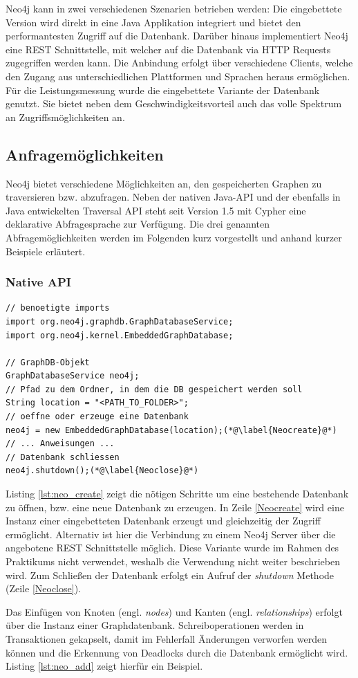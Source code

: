 \documentclass[11pt, a4paper, oneside]{article} %
\begin{document}
Neo4j kann in zwei verschiedenen Szenarien betrieben werden: Die eingebettete Version wird direkt in eine Java Applikation integriert und bietet den performantesten Zugriff auf die Datenbank. Darüber hinaus implementiert Neo4j eine REST Schnittstelle, mit welcher auf die Datenbank via HTTP Requests zugegriffen werden kann. Die Anbindung erfolgt über verschiedene Clients, welche den Zugang aus unterschiedlichen Plattformen und Sprachen heraus ermöglichen.\\
Für die Leistungsmessung wurde die eingebettete Variante der Datenbank genutzt. Sie bietet neben dem Geschwindigkeitsvorteil auch das volle Spektrum an Zugriffsmöglichkeiten an.

\subsection{Anfragemöglichkeiten}

Neo4j bietet verschiedene Möglichkeiten an, den gespeicherten Graphen zu traversieren bzw. abzufragen. Neben der nativen Java-API und der ebenfalls in Java entwickelten Traversal API steht seit Version 1.5 mit Cypher eine deklarative Abfragesprache zur Verfügung. Die drei genannten Abfragemöglichkeiten werden im Folgenden kurz vorgestellt und anhand kurzer Beispiele erläutert.

\subsubsection{Native API}

\begin{lstlisting}[caption={Erstellen, Öffnen und Schließen einer Datenbank},label={lst:neo_create}]
// benoetigte imports
import org.neo4j.graphdb.GraphDatabaseService;
import org.neo4j.kernel.EmbeddedGraphDatabase;

// GraphDB-Objekt
GraphDatabaseService neo4j;
// Pfad zu dem Ordner, in dem die DB gespeichert werden soll
String location = "<PATH_TO_FOLDER>";
// oeffne oder erzeuge eine Datenbank
neo4j = new EmbeddedGraphDatabase(location);(*@\label{Neocreate}@*)
// ... Anweisungen ...
// Datenbank schliessen
neo4j.shutdown();(*@\label{Neoclose}@*)
\end{lstlisting}

Listing \ref{lst:neo_create} zeigt die nötigen Schritte um eine bestehende Datenbank zu öffnen, bzw. eine neue Datenbank zu erzeugen. In Zeile \ref{Neocreate} wird eine Instanz einer eingebetteten Datenbank erzeugt und gleichzeitig der Zugriff ermöglicht. Alternativ ist hier die Verbindung zu einem Neo4j Server über die angebotene REST Schnittstelle möglich. Diese Variante wurde im Rahmen des Praktikums nicht verwendet, weshalb die Verwendung nicht weiter beschrieben wird. Zum Schließen der Datenbank erfolgt ein Aufruf der \textit{shutdown} Methode (Zeile \ref{Neoclose}).
\par
Das Einfügen von Knoten (engl. \textit{nodes}) und Kanten (engl. \textit{relationships}) erfolgt über die Instanz einer Graphdatenbank. Schreiboperationen werden in Transaktionen gekapselt, damit im Fehlerfall Änderungen verworfen werden können und die Erkennung von Deadlocks durch die Datenbank ermöglicht wird. Listing \ref{lst:neo_add} zeigt hierfür ein Beispiel.
\end{document}

